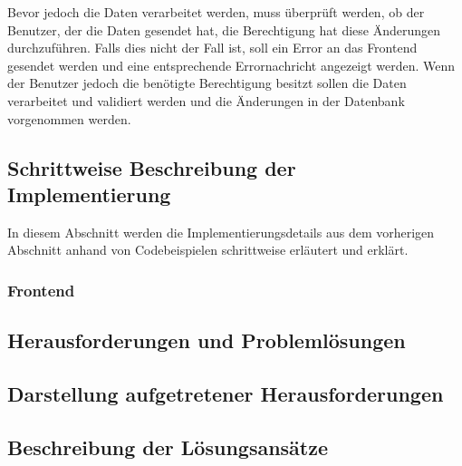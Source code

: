 Bevor jedoch die Daten verarbeitet werden, muss überprüft werden, ob der Benutzer, der die Daten gesendet hat, die Berechtigung hat diese Änderungen durchzuführen.
Falls dies nicht der Fall ist, soll ein Error an das Frontend gesendet werden und eine entsprechende Errornachricht angezeigt werden.
Wenn der Benutzer jedoch die benötigte Berechtigung besitzt sollen die Daten verarbeitet und validiert werden und die Änderungen in der Datenbank vorgenommen werden.

\subsection[Schrittweise Beschreibung der Implementierung]{Schrittweise Beschreibung der Implementierung}

In diesem Abschnitt werden die Implementierungsdetails aus dem vorherigen Abschnitt anhand von Codebeispielen schrittweise erläutert und erklärt.

\subsubsection{Frontend}


\subsection[Herausforderungen und Problemlösungen]{Herausforderungen und Problemlösungen}

\subsection[Darstellung aufgetretener Herausforderungen]{Darstellung aufgetretener Herausforderungen}

\subsection[Beschreibung der Lösungsansätze]{Beschreibung der Lösungsansätze}
